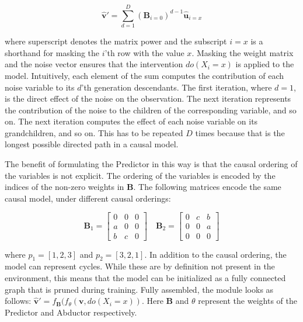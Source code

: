 \documentclass{article}
\begin{document}
\begin{equation}
    \mathbf{\hat{v}}' = \sum_{d=1}^D \left(\mathbf{B}_{i=0}\right)^{d-1} \mathbf{\hat{u}}_{i=x}
\end{equation}

where superscript denotes the matrix power and the subscript ${i=x}$ is a shorthand for masking the $i$'th row with the value $x$. Masking the weight matrix and the noise vector ensures that the intervention $do(X_i=x)$ is applied to the model. Intuitively, each element of the sum computes the contribution of each noise variable to  its $d$'th generation descendants. The first iteration, where $d=1$, is the direct effect of the noise on the observation. The next iteration represents the contribution of the noise to the children of the corresponding variable, and so on. The next iteration computes the effect of each noise variable on its grandchildren, and so on. This has to be repeated $D$ times because that is the longest possible directed path in a causal model.

The benefit of formulating the Predictor in this way is that the causal ordering of the variables is not explicit. The ordering of the variables is encoded by the indices of the non-zero weights in $\mathbf{B}$. The following matrices encode the same causal model, under different causal orderings:

\begin{equation}
    \mathbf{B}_1 = \begin{bmatrix}
        0 & 0 & 0 \\
        a & 0 & 0 \\
        b & c & 0
    \end{bmatrix} \quad \mathbf{B}_2 = \begin{bmatrix}
        0 & c & b \\
        0 & 0 & a \\
        0 & 0 & 0
    \end{bmatrix}
\end{equation}

where $p_1 = [1, 2, 3]$ and $p_2 = [3, 2, 1]$. In addition to the causal ordering, the model can represent cycles. While these are by definition not present in the environment, this means that the model can be initialized as a fully connected graph that is pruned during training. Fully assembled, the module looks as follows: $\hat{\textbf{v}}' = f_\mathbf{B}(f_\theta(\textbf{v}, do(X_i=x))$. Here $\mathbf{B}$ and $\theta$ represent the weights of the Predictor and Abductor respectively.
\end{document}
